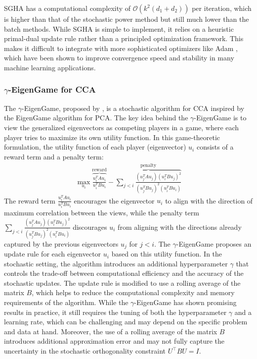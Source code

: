 SGHA has a computational complexity of $\mathcal{O}(k^2(d_1+ d_2))$ per iteration, which is higher than that of the stochastic power method but still much lower than the batch methods.
While SGHA is simple to implement, it relies on a heuristic primal-dual update rule rather than a principled optimization framework. This makes it difficult to integrate with more sophisticated optimizers like Adam \citep{kingma2014adam}, which have been shown to improve convergence speed and stability in many machine learning applications.
\subsubsection{$\gamma$-EigenGame for CCA}
The $\gamma$-EigenGame, proposed by \citet{gemp20,gemp2021}, is a stochastic algorithm for CCA inspired by the EigenGame algorithm for PCA. The key idea behind the $\gamma$-EigenGame is to view the generalized eigenvectors as competing players in a game, where each player tries to maximize its own utility function.
In this game-theoretic formulation, the utility function of each player (eigenvector) $u_i$ consists of a reward term and a penalty term:
\begin{align}
\max_{u_i} \overbrace{\frac{u_i^TAu_i}{u_i^TBu_i}}^{\text{reward}} - \overbrace{\sum_{j < i} \frac{(u_j^TAu_j)(u_i^TBu_j)^2}{(u_j^TBu_j)^2(u_i^TBu_i)}}^{\text{penalty}}
\end{align}
The reward term $\frac{u_i^TAu_i}{u_i^TBu_i}$ encourages the eigenvector $u_i$ to align with the direction of maximum correlation between the views, while the penalty term $\sum_{j < i} \frac{(u_j^TAu_j)(u_i^TBu_j)^2}{(u_j^TBu_j)^2(u_i^TBu_i)}$ discourages $u_i$ from aligning with the directions already captured by the previous eigenvectors $u_j$ for $j < i$.
The $\gamma$-EigenGame proposes an update rule for each eigenvector $u_i$ based on this utility function. In the stochastic setting, the algorithm introduces an additional hyperparameter $\gamma$ that controls the trade-off between computational efficiency and the accuracy of the stochastic updates. The update rule is modified to use a rolling average of the matrix $B$, which helps to reduce the computational complexity and memory requirements of the algorithm.
While the $\gamma$-EigenGame has shown promising results in practice, it still requires the tuning of both the hyperparameter $\gamma$ and a learning rate, which can be challenging and may depend on the specific problem and data at hand.
Moreover, the use of a rolling average of the matrix $B$ introduces additional approximation error and may not fully capture the uncertainty in the stochastic orthogonality constraint $U^\top B U = I$.

